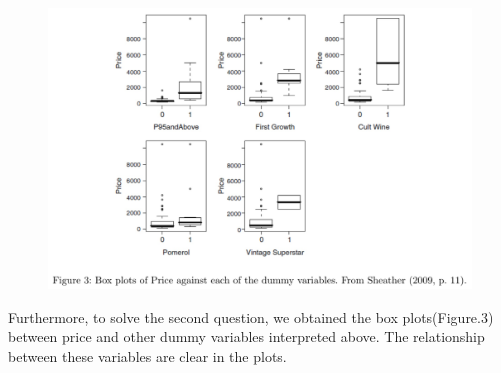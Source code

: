 \documentclass[11pt]{article}
\begin{document}
\begin{figure}[h]
    \centering
    \includegraphics[width=15cm]{Fig03.jpg}
    \label{fig:galaxy}
\end{figure}
Furthermore, to solve the second question, we obtained the box plots(Figure.3) between price and other dummy variables interpreted above. The relationship between these variables are clear in the plots.
\end{document}

